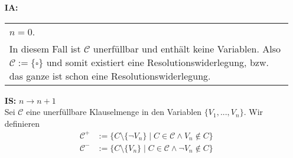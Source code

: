 \documentclass[a4paper,10pt]{article}
\newcommand{\tabspace}{15cm}
\begin{document}
\begin{itemize}
	\item[\textbf{IA:}] 
		\begin{tabular}{@{} p{\tabspace}}
		$n=0$. \\
		In diesem Fall ist $\mathcal{C}$ unerfüllbar und enthält keine Variablen. Also $\mathcal{C} := \{ \square \}$ und somit existiert eine Resolutionswiderlegung, bzw. das ganze ist schon eine Resolutionswiderlegung.
		\end{tabular}
	\item[\textbf{IS:}] $n \rightarrow n+1$ \\
	
		Sei $\mathcal{C}$ eine unerfüllbare Klauselmenge in den Variablen $\{V_1,...,V_n \}$. Wir definieren
		\begin{align*}
			\mathcal{C}^+ &:= \{C \setminus \{ \lnot V_n  \} \mid C \in \mathcal{C} \land V_n \not \in C \} \\
			\mathcal{C}^- &:= \{C \setminus \{V_n  \} \mid C \in \mathcal{C} \land \lnot V_n \not \in C \}
		\end{align*}
		

\end{itemize}
\end{document}
